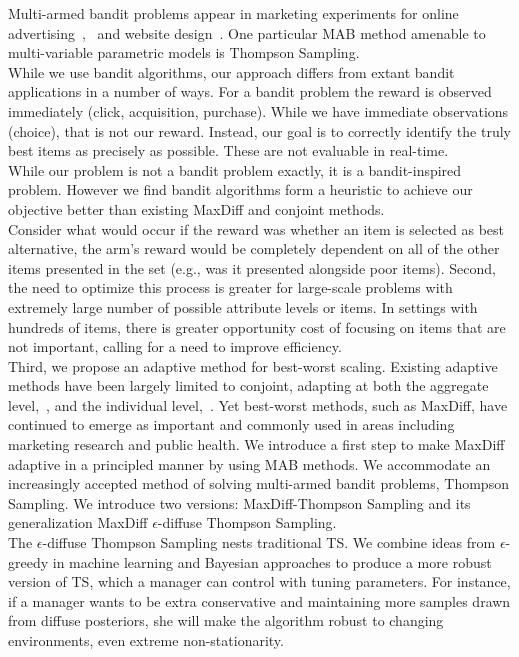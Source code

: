 \documentclass[nonblindrev]{informs3}
\begin{document}
Multi-armed bandit problems appear in marketing experiments for online advertising~\cite{schwartz2015customer},~\cite{urban2013morphing} and website design~\cite{hauser2009website}. One particular MAB method amenable to multi-variable parametric models is Thompson Sampling.\\
While we use bandit algorithms, our approach differs from extant bandit applications in a number of ways. For a bandit problem the reward is observed immediately (click, acquisition, purchase). While we have immediate observations (choice), that is not our reward. Instead, our goal is to correctly identify the truly best items as precisely as possible. These are not evaluable in real-time. \\
While our problem is not a bandit problem exactly, it is a bandit-inspired problem. However we find bandit algorithms form a heuristic to achieve our objective better than existing MaxDiff and conjoint methods. \\
Consider what would occur if the reward was whether an item is selected as best alternative, the arm's reward would be completely dependent on all of the other items presented in the set (e.g., was it presented alongside poor items). 
Second, the need to optimize this process is greater for large-scale problems with extremely large number of possible attribute levels or items.  In settings with hundreds of items, there is greater opportunity cost of focusing on items that are not important, calling for a need to improve efficiency.\\
Third, we propose an adaptive method for best-worst scaling. Existing adaptive methods have been largely limited to conjoint, adapting at both the aggregate level,~\cite{arora2001improving}, and the individual level,~\cite{toubia2004polyhedral}. Yet best-worst methods, such as MaxDiff, have continued to emerge as important and commonly used in areas including marketing research and public health. We introduce a first step to make MaxDiff adaptive in a principled manner by using MAB methods. We accommodate an increasingly accepted method of solving multi-armed bandit problems, Thompson Sampling. We introduce two versions: MaxDiff-Thompson Sampling and its generalization MaxDiff $\epsilon$-diffuse Thompson Sampling.\\
The $\epsilon$-diffuse Thompson Sampling nests traditional TS. We combine ideas from $\epsilon$-greedy in machine learning and Bayesian approaches to produce a more robust version of TS,  which a manager can control with tuning parameters. For instance, if a manager wants to be extra conservative and maintaining more samples drawn from diffuse posteriors, she will make the algorithm robust to changing environments, even extreme non-stationarity. \\
\end{document}
